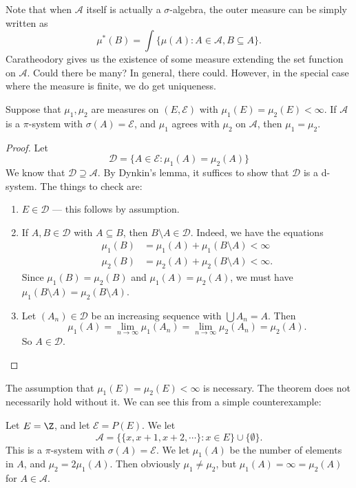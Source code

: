 \documentclass[a4paper]{article}
\begin{document}
Note that when $\mathcal{A}$ itself is actually a $\sigma$-algebra, the outer measure can be simply written as
\[
  \mu^*(B) = \int \{\mu(A): A \in \mathcal{A}, B \subseteq A\}.
\]
Caratheodory gives us the existence of some measure extending the set function on $\mathcal{A}$. Could there be many? In general, there could. However, in the special case where the measure is finite, we do get uniqueness.
\begin{thm}
  Suppose that $\mu_1, \mu_2$ are measures on $(E, \mathcal{E})$ with $\mu_1(E) = \mu_2(E) < \infty$. If $\mathcal{A}$ is a $\pi$-system with $\sigma(A) = \mathcal{E}$, and $\mu_1$ agrees with $\mu_2$ on $\mathcal{A}$, then $\mu_1 = \mu_2$.
\end{thm}

\begin{proof}
  Let
  \[
    \mathcal{D} = \{A \in \mathcal{E}: \mu_1(A) = \mu_2(A)\}
  \]
  We know that $\mathcal{D} \supseteq \mathcal{A}$. By Dynkin's lemma, it suffices to show that $\mathcal{D}$ is a d-system. The things to check are:
  \begin{enumerate}
    \item $E \in \mathcal{D}$ --- this follows by assumption.
    \item If $A, B \in \mathcal{D}$ with $A \subseteq B$, then $B \setminus A \in \mathcal{D}$. Indeed, we have the equations
      \begin{align*}
        \mu_1(B) &= \mu_1(A) + \mu_1(B \setminus A) < \infty\\
        \mu_2(B) &= \mu_2(A) + \mu_2(B \setminus A) < \infty.
      \end{align*}
      Since $\mu_1(B) = \mu_2(B)$ and $\mu_1(A) = \mu_2(A)$, we must have $\mu_1(B \setminus A) = \mu_2(B \setminus A)$.
    \item Let $(A_n) \in \mathcal{D}$ be an increasing sequence with $\bigcup A_n = A$. Then
      \[
        \mu_1(A) = \lim_{n \to \infty}\mu_1(A_n) = \lim_{n \to \infty} \mu_2(A_n) = \mu_2(A).
      \]
      So $A \in\mathcal{D}$.
  \end{enumerate}
\end{proof}
The assumption that $\mu_1(E) = \mu_2(E) < \infty$ is necessary. The theorem does not necessarily hold without it. We can see this from a simple counterexample:

\begin{eg}
  Let $E = \Z$, and let $\mathcal{E} = P(E)$. We let
  \[
    \mathcal{A} = \{\{x, x+1, x+2, \cdots\}: x \in E\} \cup \{\emptyset\}.
  \]
  This is a $\pi$-system with $\sigma(A) = \mathcal{E}$. We let $\mu_1(A)$ be the number of elements in $A$, and $\mu_2 = 2\mu_1(A)$. Then obviously $\mu_1 \not= \mu_2$, but $\mu_1(A) = \infty = \mu_2(A)$ for $A \in \mathcal{A}$.
\end{eg}
\end{document}
